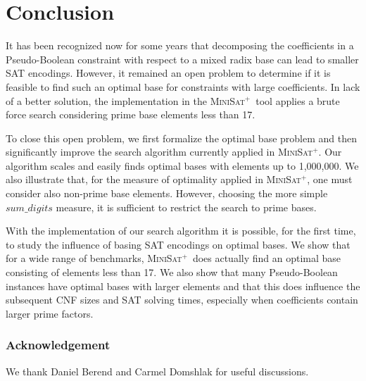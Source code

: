 \documentclass[envcountsame]{llncs}
\newcommand\minisatp{\textsc{MiniSat$^+$}}
\newcommand{\sumDigits}{\mathit{sum\_digits}}
\begin{document}
\section{Conclusion}
\label{sec:conc}

It has been recognized now for some years that decomposing the
coefficients in a Pseudo-Boolean constraint with respect to a mixed
radix base can lead to smaller SAT encodings. However, it remained an
open problem to determine if it is feasible to find such an optimal
base for constraints with large coefficients. In lack of a better
solution, the implementation in the \minisatp\ tool applies a brute
force search considering prime base elements less than 17.



To close this open problem, we first formalize the optimal base
problem and then significantly improve the search algorithm currently
applied in \minisatp.
Our algorithm scales and easily finds optimal bases
with elements up to 1,000,000.
We also illustrate that, for the
measure of optimality applied in \minisatp, one must consider also
non-prime base elements. However, choosing the more simple
$\sumDigits$ measure, it is sufficient to restrict the search to prime
bases.

With the implementation of our search algorithm it is possible, for
the first time, to study the influence of basing SAT encodings on
optimal bases.  We show that for a wide range of benchmarks,
\minisatp\ does actually find an optimal base consisting of elements
less than 17.  We also show that many Pseudo-Boolean instances have
optimal bases with larger elements and that this does influence the
subsequent CNF sizes and SAT solving times, especially when
coefficients contain larger prime factors.



\vspace{-2ex}

\subsubsection*{Acknowledgement}
We thank Daniel Berend and Carmel Domshlak for useful discussions.

\vspace{-2ex}
\end{document}
